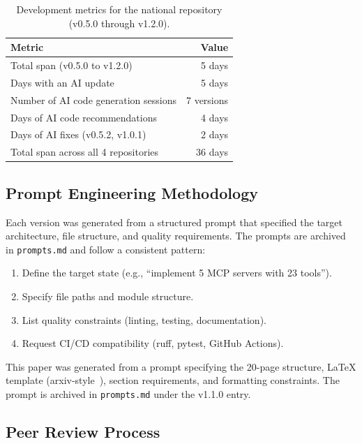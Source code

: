 \documentclass{article}
\begin{document}
\begin{table}[H]
\centering
\caption{Development metrics for the national repository (v0.5.0 through v1.2.0).}
\label{tab:dev-metrics}
\small
\begin{tabular}{@{}lr@{}}
\toprule
\textbf{Metric} & \textbf{Value} \\
\midrule
Total span (v0.5.0 to v1.2.0) & 5 days \\
Days with an AI update & 5 days \\
Number of AI code generation sessions & 7 versions \\
Days of AI code recommendations & 4 days \\
Days of AI fixes (v0.5.2, v1.0.1) & 2 days \\
Total span across all 4 repositories & 36 days \\
\bottomrule
\end{tabular}
\end{table}

\subsection{Prompt Engineering Methodology}

Each version was generated from a structured prompt that specified the target architecture, file structure, and quality requirements. The prompts are archived in \texttt{prompts.md} and follow a consistent pattern:

\begin{enumerate}[leftmargin=*]
\item Define the target state (e.g., ``implement 5 MCP servers with 23 tools'').
\item Specify file paths and module structure.
\item List quality constraints (linting, testing, documentation).
\item Request CI/CD compatibility (ruff, pytest, GitHub Actions).
\end{enumerate}

This paper was generated from a prompt specifying the 20-page structure, LaTeX template (arxiv-style~\cite{arxivstyle}), section requirements, and formatting constraints. The prompt is archived in \texttt{prompts.md} under the v1.1.0 entry.

\subsection{Peer Review Process}
\end{document}
